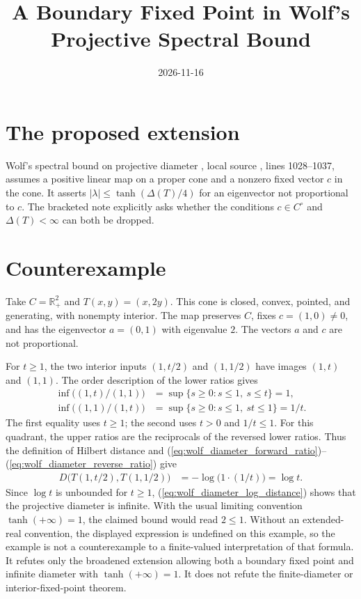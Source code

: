 \documentclass{article}
\title{A Boundary Fixed Point in Wolf's Projective Spectral Bound}
\author{}
\date{2026-11-16}
\begin{document}
\maketitle
{}

\section{The proposed extension}
Wolf's spectral bound on projective diameter
\cite[Equation (8.91)]{Wolf2012Quantum}, local source
, lines 1028--1037,
assumes a positive linear map on a proper cone and a nonzero fixed vector
$c$ in the cone. It asserts $|\lambda|\le\tanh(\Delta(T)/4)$ for an eigenvector
not proportional to $c$. The bracketed note explicitly asks whether the
conditions $c\in C^\circ$ and $\Delta(T)<\infty$ can both be dropped.

\section{Counterexample}
Take $C=\mathbb R_+^2$ and $T(x,y)=(x,2y)$. This cone is closed, convex,
pointed, and generating, with nonempty interior. The map preserves $C$,
fixes $c=(1,0)\ne0$, and has the eigenvector $a=(0,1)$ with eigenvalue $2$.
The vectors $a$ and $c$ are not proportional.

For $t\ge1$, the two interior inputs $(1,t/2)$ and $(1,1/2)$ have images
$(1,t)$ and $(1,1)$. The order description of the lower ratios gives
\begin{align}
    \inf\bigl((1,t)/(1,1)\bigr)
        &= \sup\{s\ge0:s\le1,\ s\le t\}=1,
        \label{eq:wolf_diameter_forward_ratio}\\
    \inf\bigl((1,1)/(1,t)\bigr)
        &= \sup\{s\ge0:s\le1,\ st\le1\}=1/t.
        \label{eq:wolf_diameter_reverse_ratio}
\end{align}
The first equality uses $t\ge1$; the second uses $t>0$ and $1/t\le1$.
For this quadrant, the upper ratios are the reciprocals of the reversed
lower ratios. Thus the definition of Hilbert distance and
(\ref{eq:wolf_diameter_forward_ratio})--(\ref{eq:wolf_diameter_reverse_ratio}) give
\begin{align}
    D\bigl(T(1,t/2),T(1,1/2)\bigr)
        &= -\log\bigl(1\cdot(1/t)\bigr)=\log t.
        \label{eq:wolf_diameter_log_distance}
\end{align}
Since $\log t$ is unbounded for $t\ge1$, (\ref{eq:wolf_diameter_log_distance})
shows that the projective diameter is infinite. With the usual limiting convention
$\tanh(+\infty)=1$, the claimed bound would read $2\le1$.
Without an extended-real convention, the displayed expression is undefined
on this example, so the example is not a counterexample to a finite-valued
interpretation of that formula. It refutes only the broadened extension
allowing both a boundary fixed point and infinite diameter with
$\tanh(+\infty)=1$. It does not refute the finite-diameter or
interior-fixed-point theorem.
\end{document}
